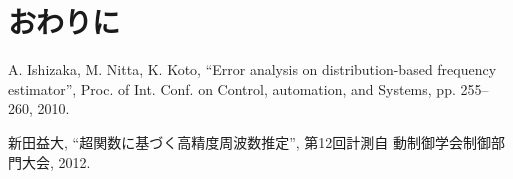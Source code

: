 \documentclass[usejistfm]{sice}
\begin{document}
\section{おわりに}


\begin{thebibliography}{}
  A. Ishizaka, M. Nitta, K. Koto, ``Error analysis on
	 distribution-based frequency estimator'', Proc. of
	 Int. Conf. on Control, automation, and Systems, pp. 255--260, 2010.

  新田益大, ``超関数に基づく高精度周波数推定'', 第12回計測自
	 動制御学会制御部門大会, 2012.

\end{thebibliography}


\begin{biography}



\end{biography}
\end{document}
